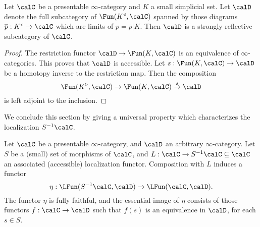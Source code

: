 \begin{lemma}\label{stur1}
Let $\calC$ be a presentable $\infty$-category and $K$ a small simplicial set.
Let $\calD$ denote the full subcategory of $\Fun(K^{\triangleleft}, \calC)$ spanned by those diagrams $\overline{p}: K^{\triangleleft} \rightarrow \calC$ which are limits of $p = \overline{p}|K$.
Then $\calD$ is a strongly reflective subcategory of $\calC$.
\end{lemma}

\begin{proof}
The restriction functor $\calD \rightarrow \Fun(K,\calC)$ is an equivalence of $\infty$-categories. This proves that $\calD$ is accessible. Let $s: \Fun(K,\calC) \rightarrow \calD$ be a homotopy inverse to the restriction map. Then the composition
$$ \Fun(K^{\triangleright}, \calC) \rightarrow \Fun(K,\calC) \stackrel{s}{\rightarrow} \calD$$
is left adjoint to the inclusion.
\end{proof}

We conclude this section by giving a universal property which characterizes the localization $S^{-1} \calC$.

\begin{proposition}\label{unichar}
Let $\calC$ be a presentable $\infty$-category, and $\calD$ an arbitrary $\infty$-category.
Let $S$ be a $($small$)$ set of morphisms of $\calC$, and $L: \calC \rightarrow S^{-1} \calC \subseteq \calC$ an associated (accessible) localization functor. Composition with $L$ induces
a functor
$$ \eta: \LFun( S^{-1} \calC, \calD) \rightarrow \LFun( \calC, \calD).$$
The functor $\eta$ is fully faithful, and the essential image of $\eta$ consists of those functors
$f: \calC \rightarrow \calD$ such that $f(s)$ is an equivalence in $\calD$, for each $s \in S$.
\end{proposition}

